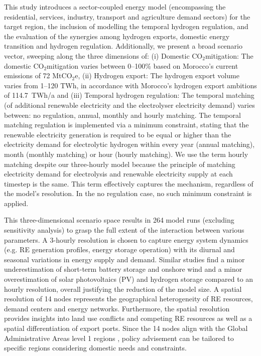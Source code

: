\documentclass[5p,numafflabel]{elsarticle}
\newcommand{\co}{\ce{CO2}~}
\def\co{CO${}_2${\:}}
\def\coe{CO${}_2$e}
\begin{document}
This study introduces a sector-coupled energy model (encompassing the residential, services, industry, transport and agriculture demand sectors) for the target region, the inclusion of modelling the temporal hydrogen regulation, and the evaluation of the synergies among hydrogen exports, domestic energy transition and hydrogen regulation.
Additionally, we present a broad scenario vector, sweeping along the three dimensions of:
(i) Domestic \co mitigation: The domestic \co mitigation varies between 0--100\% based on Morocco's current emissions of 72 Mt\coe,
(ii) Hydrogen export: The hydrogen export volume varies from 1--120 TWh, in accordance with Morocco's hydrogen export ambitions of 114.7~TWh/a and
(iii) Temporal hydrogen regulation: The temporal matching (of additional renewable electricity and the electrolyser electricity demand) varies between: no regulation, annual, monthly and hourly matching. The temporal matching regulation is implemented via a minimum constraint, stating that the renewable electricity generation is required to be equal or higher than the electricity demand for electrolytic hydrogen within every year (annual matching), month (monthly matching) or hour (hourly matching). 
We use the term hourly matching despite our three-hourly model because the principle of matching electricity demand for electrolysis and renewable electricity supply at each timestep is the same. This term effectively captures the mechanism, regardless of the model’s resolution. In the no regulation case, no such minimum constraint is applied.

This three-dimensional scenario space results in 264 model runs (excluding sensitivity analysis) to grasp the full extent of the interaction between various parameters.
A 3-hourly resolution is chosen to capture energy system dynamics (e.g. RE generation profiles, energy storage operation) with its diurnal and seasonal variations in energy supply and demand. Similar studies \cite{Neumann2022, Schlachtberger2018} find a minor underestimation of short-term battery storage and onshore wind and a minor overestimation of solar photovoltaics (PV) and hydrogen storage compared to an hourly resolution, overall justifying the reduction of the model size. 
A spatial resolution of 14 nodes represents the geographical heterogeneity of RE resources, demand centers and energy networks. Furthermore, the spatial resolution provides insights into land use conflicts and competing RE resources as well as a spatial differentiation of export ports. Since the 14 nodes align with the Global Administrative Areas level 1 regions \cite{gadm2022}, policy advisement can be tailored to specific regions considering domestic needs and constraints.
\end{document}
